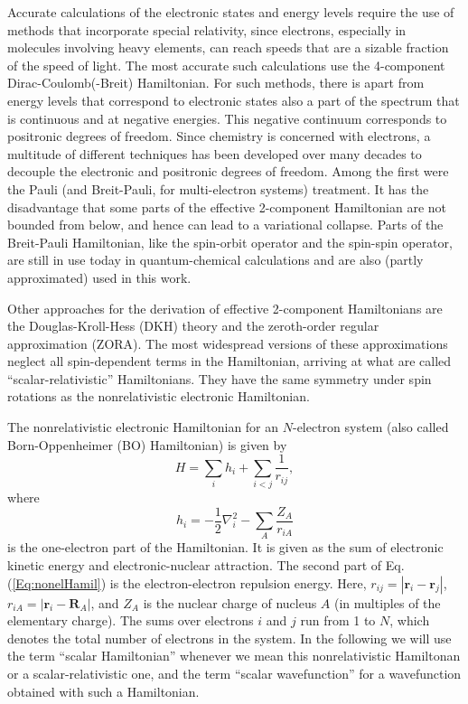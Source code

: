 Accurate calculations of the electronic states and energy levels require the use of methods that incorporate special relativity, since electrons, especially in molecules involving heavy elements, can reach speeds that are a sizable fraction of the speed of light. The most accurate such calculations use the 4-component Dirac-Coulomb(-Breit) Hamiltonian.\cite{Saue_2011_3077} For such methods, there is apart from energy levels that correspond to electronic states also a part of the spectrum that is continuous and at negative energies. This negative continuum corresponds to positronic degrees of freedom. Since chemistry is concerned with electrons, a multitude of different techniques has been developed over many decades to decouple the electronic and positronic degrees of freedom.\cite{Saue_2011_3077} Among the first were the Pauli (and Breit-Pauli, for multi-electron systems) treatment. It has the disadvantage that some parts of the effective 2-component Hamiltonian are not bounded from below, and hence can lead to a variational collapse.\cite{ReiheW_2009_} Parts of the Breit-Pauli Hamiltonian, like the spin-orbit operator and the spin-spin operator, are still in use today in quantum-chemical calculations and are also (partly approximated) used in this work.

Other approaches for the derivation of effective 2-component Hamiltonians are the Doug\-las-Kroll-Hess (DKH) theory and the zeroth-order regular approximation (ZORA). The most widespread versions of these approximations neglect all spin-dependent terms in the Hamiltonian, arriving at what are called ``scalar-relativistic'' Hamiltonians. They have the same symmetry under spin rotations as the nonrelativistic electronic Hamiltonian. 

The nonrelativistic electronic Hamiltonian for an $N$-electron system (also called Born-Oppenheimer (BO) Hamiltonian) is given by\cite{SzaboO_1996_}
\begin{equation}
\label{Eq:nonelHamil}
H = \sum_i h_i + \sum_{i<j} \frac{1}{r_{ij}},
\end{equation}
where 
\begin{equation}
h_i = -\frac{1}{2}\nabla_i^2 - \sum_A \frac{Z_A}{r_{iA}}
\end{equation}
is the one-electron part of the Hamiltonian. It is given as the sum of electronic kinetic energy and electronic-nuclear attraction. The second part of Eq. (\ref{Eq:nonelHamil}) is the electron-electron repulsion energy. Here, $r_{ij} = |\mathbf{r}_i - \mathbf{r}_j|$,  $r_{iA} = |\mathbf{r}_i - \mathbf{R}_A|$, and $Z_A$ is the nuclear charge of nucleus $A$ (in multiples of the elementary charge). The sums over electrons $i$ and $j$ run from 1 to $N$, which denotes the total number of electrons in the system. In the following we will use the term ``scalar Hamiltonian'' whenever we mean this nonrelativistic Hamiltonan or a scalar-relativistic one, and the term ``scalar wavefunction'' for a wavefunction obtained with such a Hamiltonian.

